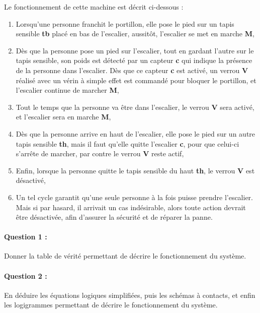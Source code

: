 Le fonctionnement de cette machine est décrit ci-dessous :
\begin{enumerate}
 \item Lorsqu'une personne franchit le portillon, elle pose le pied sur un tapis sensible \textbf{tb} placé en bas de l'escalier, aussitôt, l'escalier se met en marche \textbf{M},
 \item Dès que la personne pose un pied sur l'escalier, tout en gardant l'autre sur le tapis sensible, son poids est détecté par un capteur \textbf{c} qui indique la présence de la personne dans l'escalier. Dès que ce capteur \textbf{c} est activé, un verrou \textbf{V} réalisé avec un vérin à simple effet est commandé pour bloquer le portillon, et l'escalier continue de marcher \textbf{M},
 \item Tout le temps que la personne va être dans l'escalier, le verrou \textbf{V} sera activé, et l'escalier sera en marche \textbf{M},
 \item Dès que la personne arrive en haut de l'escalier, elle pose le pied sur un autre tapis sensible \textbf{th}, mais il faut qu'elle quitte l'escalier \textbf{c}, pour que celui-ci s'arrête de marcher, par contre le verrou \textbf{V} reste actif,
 \item Enfin, lorsque la personne quitte le tapis sensible du haut \textbf{th}, le verrou \textbf{V} est désactivé,
 \item Un tel cycle garantit qu'une seule personne à la fois puisse prendre l'escalier. Mais si par hasard, il arrivait un cas indésirable, alors toute action devrait être désactivée, afin d'assurer la sécurité et de réparer la panne.
\end{enumerate}

\paragraph{Question 1 :} Donner la table de vérité permettant de décrire le fonctionnement du système.

\paragraph{Question 2 :} En déduire les équations logiques simplifiées, puis les schémas à contacts, et enfin les  logigrammes permettant de décrire le fonctionnement du système.


\newpage


~\

\newpage



